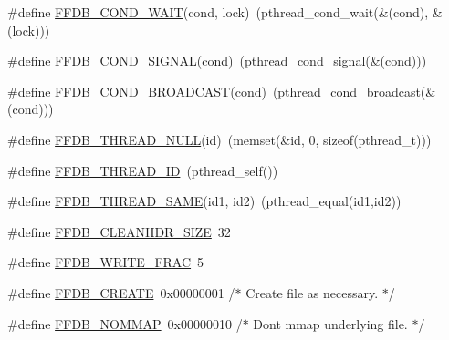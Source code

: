 \begin{DoxyCompactItemize}
\item 
\#define \mbox{\hyperlink{adat-devel_2other__libs_2filedb_2filehash_2ffdb__pagepool_8h_a49abcb87f048d8d4c421ef4207ad69ab}{F\+F\+D\+B\+\_\+\+C\+O\+N\+D\+\_\+\+W\+A\+IT}}(cond,  lock)~(pthread\+\_\+cond\+\_\+wait(\&(cond), \&(lock)))
\item 
\#define \mbox{\hyperlink{adat-devel_2other__libs_2filedb_2filehash_2ffdb__pagepool_8h_a9e2a8af69413cb35dc258ff446c2810e}{F\+F\+D\+B\+\_\+\+C\+O\+N\+D\+\_\+\+S\+I\+G\+N\+AL}}(cond)~(pthread\+\_\+cond\+\_\+signal(\&(cond)))
\item 
\#define \mbox{\hyperlink{adat-devel_2other__libs_2filedb_2filehash_2ffdb__pagepool_8h_a649f90878924e345296bdd6d855bb67a}{F\+F\+D\+B\+\_\+\+C\+O\+N\+D\+\_\+\+B\+R\+O\+A\+D\+C\+A\+ST}}(cond)~(pthread\+\_\+cond\+\_\+broadcast(\&(cond)))
\item 
\#define \mbox{\hyperlink{adat-devel_2other__libs_2filedb_2filehash_2ffdb__pagepool_8h_a431000f2ae42020b7e1831dba9716c31}{F\+F\+D\+B\+\_\+\+T\+H\+R\+E\+A\+D\+\_\+\+N\+U\+LL}}(id)~(memset(\&id, 0, sizeof(pthread\+\_\+t)))
\item 
\#define \mbox{\hyperlink{adat-devel_2other__libs_2filedb_2filehash_2ffdb__pagepool_8h_aaa0ec4d7b88f89a37915755f01d8687a}{F\+F\+D\+B\+\_\+\+T\+H\+R\+E\+A\+D\+\_\+\+ID}}~(pthread\+\_\+self())
\item 
\#define \mbox{\hyperlink{adat-devel_2other__libs_2filedb_2filehash_2ffdb__pagepool_8h_af6a6441c16eee0ed7b4b0e730015335b}{F\+F\+D\+B\+\_\+\+T\+H\+R\+E\+A\+D\+\_\+\+S\+A\+ME}}(id1,  id2)~(pthread\+\_\+equal(id1,id2))
\item 
\#define \mbox{\hyperlink{adat-devel_2other__libs_2filedb_2filehash_2ffdb__pagepool_8h_a218c8b508b6d70a0c806c7a5c544c25a}{F\+F\+D\+B\+\_\+\+C\+L\+E\+A\+N\+H\+D\+R\+\_\+\+S\+I\+ZE}}~32
\item 
\#define \mbox{\hyperlink{adat-devel_2other__libs_2filedb_2filehash_2ffdb__pagepool_8h_a896afa4e850cfdef005b805712ed8812}{F\+F\+D\+B\+\_\+\+W\+R\+I\+T\+E\+\_\+\+F\+R\+AC}}~5
\item 
\#define \mbox{\hyperlink{adat-devel_2other__libs_2filedb_2filehash_2ffdb__pagepool_8h_ac275e89e5a9d7918449b3fb9d2b57c7d}{F\+F\+D\+B\+\_\+\+C\+R\+E\+A\+TE}}~0x00000001    /$\ast$ Create file as necessary. $\ast$/
\item 
\#define \mbox{\hyperlink{adat-devel_2other__libs_2filedb_2filehash_2ffdb__pagepool_8h_a6287665e8a01d5bb20d053bb730b87fc}{F\+F\+D\+B\+\_\+\+N\+O\+M\+M\+AP}}~0x00000010    /$\ast$ Don\textquotesingle{}t mmap underlying file. $\ast$/
\item 

\end{DoxyCompactItemize}

